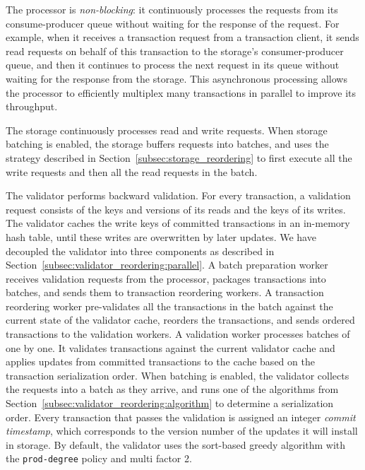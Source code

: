 The processor is \emph{non-blocking}: it continuously processes the requests from its consume-producer queue without waiting for the response of the request. For example, when it receives a transaction request from a transaction client, it sends read requests on behalf of this transaction to the storage's consumer-producer queue, and then it continues to process the next request in its queue without waiting for the response from the storage. This asynchronous processing allows the processor to efficiently multiplex many transactions in parallel to improve its throughput.


The storage continuously processes read and write requests. When storage batching is enabled, the storage buffers requests into batches, and uses the strategy described in Section~\ref{subsec:storage_reordering} to first execute all the write requests and then all the read requests in the batch.

The validator performs backward validation. For every transaction, a validation request consists of the keys and versions of its reads and the keys of its writes. The validator caches the write keys of committed transactions in an in-memory hash table, until these writes are overwritten by later updates.
We have decoupled the validator into three components as described in Section~\ref{subsec:validator_reordering:parallel}. A batch preparation worker receives validation requests from the processor, packages transactions into batches, and sends them to transaction reordering workers. A transaction reordering worker pre-validates all the transactions in the batch against the current state of the validator cache, reorders the transactions, and sends ordered transactions to the validation workers. A validation worker processes batches of  one by one. It validates transactions against the current validator cache and applies updates from committed transactions to the cache based on the transaction serialization order.  When batching is enabled, the validator collects the requests into a batch as they arrive, and runs one of the algorithms from Section~\ref{subsec:validator_reordering:algorithm} to determine a serialization order. Every transaction that passes the validation is assigned an integer \emph{commit timestamp}, which corresponds to the version number of the updates it will install in storage. 
By default, the validator uses the sort-based greedy algorithm with the \texttt{prod-degree} policy and multi factor 2.


